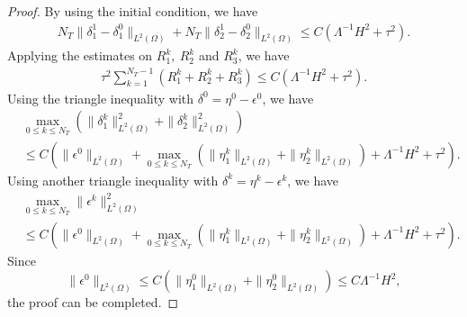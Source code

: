 \documentclass[preprint,12pt]{elsarticle}
\begin{document}
\begin{proof}
By using the initial condition, we have
\begin{equation}\label{2.18}
\begin{aligned}
N_{T}\|\delta_1^1-\delta_1^0\|_{L^2(\Omega)}+N_{T}\|\delta_2^1-\delta_2^0\|_{L^2(\Omega)}\leq C(\Lambda^{-1}H^2+\tau^2).
\end{aligned}
\end{equation}
Applying the estimates on $R_1^k,~R_2^k$ and $R_3^k$, we have
\begin{equation}\label{2.19}
\begin{aligned}
\tau^2\sum_{k=1}^{N_T-1}(R_1^k+R_2^k+R_3^k)\leq C(\Lambda^{-1}H^2+\tau^2).
\end{aligned}
\end{equation}
Using the triangle inequality with $\delta^0=\eta^0-\epsilon^0$, we have
\begin{equation}\label{2.20}
\begin{aligned}
&\max_{0\leq k\leq N_T}(\|\delta_1^k\|^2_{L^2(\Omega)}+\|\delta_2^k\|^2_{L^2(\Omega)})\\
&\leq C\left(\|\epsilon^0\|_{L^2(\Omega)}+\max_{0\leq k\leq N_T}\left(\|\eta_1^k\|_{L^2(\Omega)}+\|\eta_2^k\|_{L^2(\Omega)}\right)+\Lambda^{-1}H^2+\tau^2\right).
\end{aligned}
\end{equation}
Using another triangle inequality with $\delta^k=\eta^k-\epsilon^k$, we have
\begin{equation}\label{2.21}
\begin{aligned}
&\max_{0\leq k\leq N_T}\|\epsilon^k\|^2_{L^2(\Omega)}\\
&\leq C\left(\|\epsilon^0\|_{L^2(\Omega)}+\max_{0\leq k\leq N_T}\left(\|\eta_1^k\|_{L^2(\Omega)}+\|\eta_2^k\|_{L^2(\Omega)}\right)+\Lambda^{-1}H^2+\tau^2\right).
\end{aligned}
\end{equation}
Since $$\|\epsilon^0\|_{L^2(\Omega)}\leq C(\|\eta_1^0\|_{L^2(\Omega)}+\|\eta_2^0\|_{L^2(\Omega)} )\leq C\Lambda^{-1}H^2,$$
the proof can be completed.
\end{proof}
% 
% 

\end{document}
